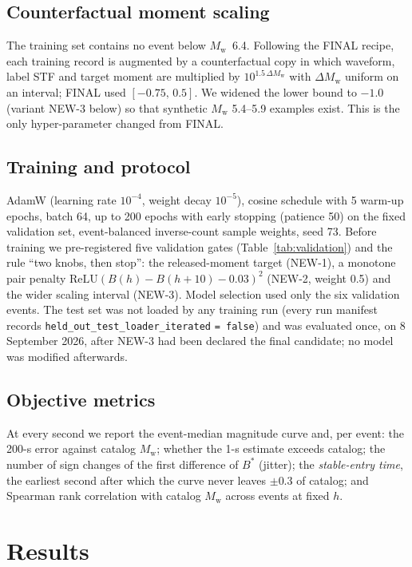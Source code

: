 \documentclass[12pt,letterpaper]{article}
\newcommand{\Mw}{M_{\mathrm{w}}}
\begin{document}
\subsection{Counterfactual moment scaling}

The training set contains no event below $\Mw$~6.4. Following the FINAL recipe, each training record is augmented by a counterfactual copy in which waveform, label STF and target moment are multiplied by $10^{1.5\,\Delta\Mw}$ with $\Delta\Mw$ uniform on an interval; FINAL used $[-0.75,\,0.5]$. We widened the lower bound to $-1.0$ (variant NEW-3 below) so that synthetic $\Mw$ 5.4--5.9 examples exist. This is the only hyper-parameter changed from FINAL.

\subsection{Training and protocol}

AdamW \citep{Loshchilov2019} (learning rate $10^{-4}$, weight decay $10^{-5}$), cosine schedule with 5 warm-up epochs, batch 64, up to 200 epochs with early stopping (patience 50) on the fixed validation set, event-balanced inverse-count sample weights, seed 73. Before training we pre-registered five validation gates (Table~\ref{tab:validation}) and the rule ``two knobs, then stop'': the released-moment target (NEW-1), a monotone pair penalty $\mathrm{ReLU}\!\left(B(h)-B(h+10)-0.03\right)^2$ (NEW-2, weight 0.5) and the wider scaling interval (NEW-3). Model selection used only the six validation events. The test set was not loaded by any training run (every run manifest records \mbox{\texttt{held\_out\_test\_loader\_iterated}} \texttt{= false}) and was evaluated once, on 8 September 2026, after NEW-3 had been declared the final candidate; no model was modified afterwards.

\subsection{Objective metrics}

At every second we report the event-median magnitude curve and, per event: the 200-s error against catalog $\Mw$; whether the 1-s estimate exceeds catalog; the number of sign changes of the first difference of $B^*$ (jitter); the \emph{stable-entry time}, the earliest second after which the curve never leaves $\pm0.3$ of catalog; and Spearman rank correlation with catalog $\Mw$ across events at fixed $h$.

\section{Results}
\end{document}
